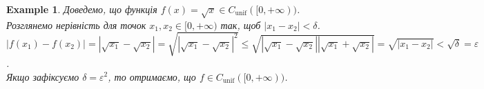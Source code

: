 \documentclass[a4paper, 14pt]{article}
\theoremstyle{theoremdd}
\theoremstyle{theoremdd}
\theoremstyle{theoremdd}
\theoremstyle{theoremdd}
\newtheorem{example}[theorem]{Example}
\theoremstyle{theoremdd}
\theoremstyle{theoremdd}
\theoremstyle{theoremdd}
\theoremstyle{theoremdd}
\begin{document}
\begin{example}
Доведемо, що функція $f(x) = \sqrt{x} \in C_{\text{unif}}([0,+\infty))$.\\
Розглянемо нерівність для точок $x_1,x_2 \in [0,+\infty)$ так, щоб $|x_1-x_2|<\delta$.\\
$|f(x_1) - f(x_2)| = |\sqrt{x_1} - \sqrt{x_2}| = \sqrt{|\sqrt{x_1} - \sqrt{x_2}|^2} \leq \sqrt{|\sqrt{x_1}-\sqrt{x_2}| |\sqrt{x_1}+\sqrt{x_2}|} = \sqrt{|x_1-x_2|} < \sqrt{\delta} = \varepsilon$.\\
Якщо зафіксуємо $\delta = \varepsilon^2$, то отримаємо, що $f \in C_{\text{unif}}([0,+\infty))$.
\\ \iffalse %
\begin{figure}[H]
\centering
\begin{tikzpicture}
\pgfmathsetmacro{\eps}{0.4};
\pgfmathsetmacro{\delt}{(\eps)^2};
\draw[thick, ->] (-0.5,0)--(4.5,0) node[anchor = north] {$x$};
\draw[thick, ->] (0,-0.5)--(0,2.5) node[anchor = east] {$y$};

\fill[blue!30] (1-\delt,{1-\eps})--(1-\delt,{1+\eps})--(1+\delt,{1+\eps})--(1+\delt,{1-\eps}) -- cycle;

\fill[blue!30] (3-\delt,{sqrt(3)-\eps})--(3-\delt,{sqrt(3)+\eps})--(3+\delt,{sqrt(3)+\eps})--(3+\delt,{sqrt(3)-\eps}) -- cycle;

\draw[thick, domain=0:4, variable=\x, samples = 500] plot({\x}, {sqrt(\x)}) node[anchor = south] {$f(x) = \sqrt{x}$};
\draw[thick, red, domain=1-\delt:1+\delt, variable=\x, samples = 40] plot({\x}, {sqrt(\x)});
\draw[thick, red, domain=3-\delt:3+\delt, variable=\x, samples = 40] plot({\x}, {sqrt(\x)});

\draw[dashed] (1-\delt,{sqrt(1)+\eps})--(1-\delt,0);
\draw[dashed] (1+\delt,{sqrt(1)+\eps})--(1+\delt,0);
\draw[dashed] (1+\delt,{sqrt(1)-\eps})--(0,{sqrt(1)-\eps});
\draw[dashed] (1+\delt,{sqrt(1)+\eps})--(0,{sqrt(1)+\eps});

\draw[dashed] (3-\delt,{sqrt(3)+\eps})--(3-\delt,0);
\draw[dashed] (3+\delt,{sqrt(3)+\eps})--(3+\delt,0);
\draw[dashed] (3+\delt,{sqrt(3)-\eps})--(0,{sqrt(3)-\eps});
\draw[dashed] (3+\delt,{sqrt(3)+\eps})--(0,{sqrt(3)+\eps});
\end{tikzpicture}
\caption*{Рівномірна неперервність означає таке: якщо візьмемо $\varepsilon>0$, ми знайдемо $\delta = \varepsilon^2$ в нашому випадку. Утворимо блакитний прямокутик -- цей прямокутник не змінить довжини, тому що всюди червона частина функції потрапляє в цей прямокутник.}
\end{figure}
\fi %
\end{example}
\end{document}
